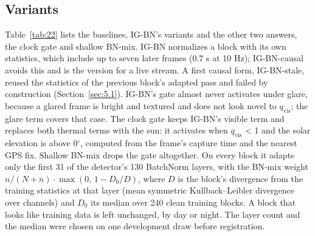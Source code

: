 \documentclass[journal]{IEEEtran}
\begin{document}
\subsection{Variants}\label{sec:4.4}
Table~\ref{tab:22} lists the baselines, \mbox{IG-BN}'s variants and the other two answers, the clock gate and shallow BN-mix. \mbox{IG-BN} normalizes a block with its own statistics, which include up to seven later frames (0.7 s at 10 Hz); \mbox{IG-BN-causal} avoids this and is the version for a live stream. A first causal form, \mbox{IG-BN-stale}, reused the statistics of the previous block's adapted pass and failed by construction (Section~\ref{sec:5.1}). \mbox{IG-BN}'s gate almost never activates under glare, because a glared frame is bright and textured and does not look novel to $q_{\mathrm{vis}}$; the glare term covers that case. The clock gate keeps \mbox{IG-BN}'s visible term and replaces both thermal terms with the sun: it activates when $q_{\mathrm{vis}}$ < 1 and the solar elevation is above 0$^{\circ}$, computed from the frame's capture time and the nearest GPS fix. Shallow BN-mix drops the gate altogether. On every block it adapts only the first 31 of the detector's 130 BatchNorm layers, with the BN-mix weight $n/(N+n)\cdot\max(0,\,1 - D_0/D)$, where $D$ is the block's divergence from the training statistics at that layer (mean symmetric Kullback--Leibler divergence over channels) and $D_0$ its median over 240 clean training blocks. A block that looks like training data is left unchanged, by day or night. The layer count and the median were chosen on one development draw before registration.
\end{document}
